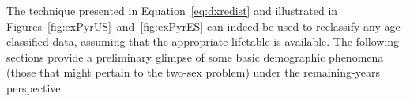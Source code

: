 \FloatBarrier
The technique presented in Equation~\ref{eq:dxredist} and illustrated in
Figures~\ref{fig:exPyrUS}~and~\ref{fig:exPyrES} can indeed be used to reclassify
any age-classified data, assuming that the appropriate lifetable is available.
The following sections provide a preliminary glimpse of some basic demographic
phenomena (those that might pertain to the two-sex problem) under the
remaining-years perspective.

